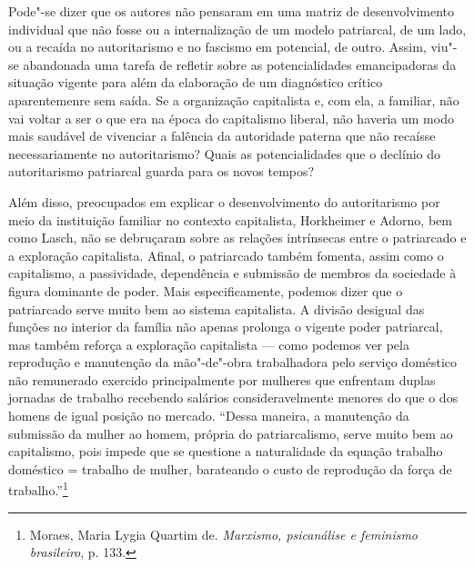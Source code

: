Pode"-se dizer que os autores não pensaram em uma matriz de
desenvolvimento individual que não fosse ou a internalização de um
modelo patriarcal, de um lado, ou a recaída no autoritarismo e no
fascismo em potencial, de outro. Assim, viu"-se abandonada uma tarefa de
refletir sobre as potencialidades emancipadoras da situação vigente para
além da elaboração de um diagnóstico crítico aparentemenre sem saída. Se
a organização capitalista e, com ela, a familiar, não vai voltar a ser o
que era na época do capitalismo liberal, não haveria um modo mais
saudável de vivenciar a falência da autoridade paterna que não recaísse
necessariamente no autoritarismo? Quais as potencialidades que o
declínio do autoritarismo patriarcal guarda para os novos tempos?

Além disso, preocupados em explicar o desenvolvimento do autoritarismo
por meio da instituição familiar no contexto capitalista, Horkheimer e
Adorno, bem como Lasch, não se debruçaram sobre as relações intrínsecas
entre o patriarcado e a exploração capitalista. Afinal, o patriarcado
também fomenta, assim como o capitalismo, a passividade, dependência e
submissão de membros da sociedade à figura dominante de poder. Mais
especificamente, podemos dizer que o patriarcado serve muito bem ao
sistema capitalista. A divisão desigual das funções no interior da
família não apenas prolonga o vigente poder patriarcal, mas também
reforça a exploração capitalista --- como podemos ver pela reprodução e
manutenção da mão"-de"-obra trabalhadora pelo serviço doméstico não
remunerado exercido principalmente por mulheres que enfrentam duplas
jornadas de trabalho recebendo salários consideravelmente menores do que
o dos homens de igual posição no mercado. ``Dessa maneira, a manutenção
da submissão da mulher ao homem, própria do patriarcalismo, serve muito
bem ao capitalismo, pois impede que se questione a naturalidade da
equação trabalho doméstico = trabalho de mulher, barateando o custo de
reprodução da força de trabalho.''\footnote{Moraes, Maria Lygia Quartim
  de. \emph{Marxismo, psicanálise e feminismo brasileiro}, p. 133.}

